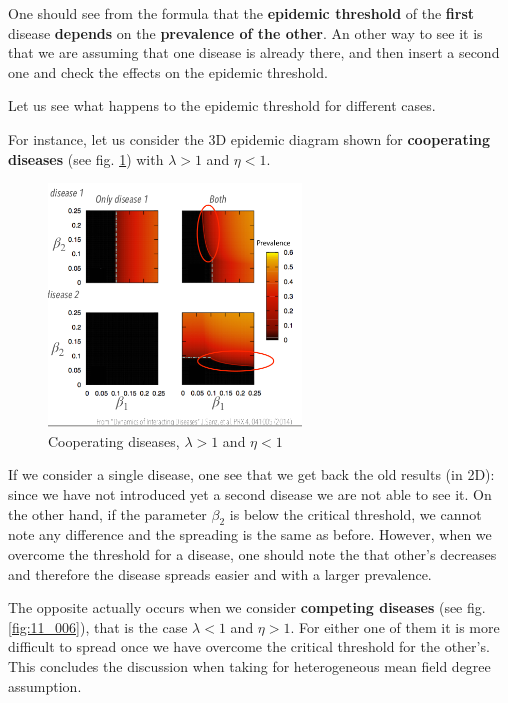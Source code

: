 \documentclass[../main/main.tex]{subfiles}
\begin{document}
One should see from the formula that the \textbf{epidemic threshold} of the \textbf{first} disease \textbf{depends} on the \textbf{prevalence of the other}. An other way to see it is that we are assuming that one disease is already there, and then insert a second one and check the effects on the epidemic threshold.

Let us see what happens to the epidemic threshold for different cases. 

For instance, let us consider the 3D epidemic diagram shown for \textbf{cooperating diseases} (see fig. \ref{fig:11_005}) with \( \lambda > 1 \) and \( \eta <1 \).

\begin{figure}[h!]
\centering
\includegraphics[width=0.6\textwidth]{../lessons/image/11/image005.png}
\caption{\label{fig:11_005} Cooperating diseases, \( \lambda > 1 \) and \( \eta <1 \) }
\end{figure}

If we consider a single disease, one see that we get back the old results (in 2D): since we have not introduced yet a second disease we are not able to see it. On the other hand, if the parameter $\beta_2$ is below the critical threshold, we cannot note any difference and the spreading is the same as before. However, when we overcome the threshold for a disease, one should note the that other's decreases and therefore the disease spreads easier and with a larger prevalence.



The opposite actually occurs when we consider \textbf{competing diseases} (see fig. \ref{fig:11_006}), that is the case \( \lambda < 1 \) and \( \eta >1 \). For either one of them it is more difficult to spread once we have overcome the critical threshold for the other's. This concludes the discussion when taking for heterogeneous mean field degree assumption.
\end{document}
